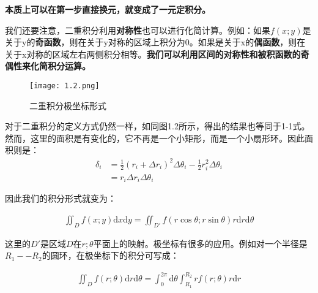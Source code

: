 \documentclass{ctexart}
\let\oldtextbf\textbf
\renewcommand{\textbf}[1]{\textcolor{brown!50!red}{\oldtextbf{#1}}}
\begin{document}
\textbf{\color{brown!50!red}本质上可以在第一步直接换元，就变成了一元定积分。}

我们还要注意，二重积分利用\textbf{\color{brown!50!red}对称性}也可以进行化简计算。例如：如果$f(x;y)$是关于y的\textbf{\color{brown!50!red}奇函数}，则在关于y对称的区域上积分为0。如果是关于x的\textbf{\color{brown!50!red}偶函数}，则在关于x对称的区域左右两侧积分相等。\textbf{\color{brown!50!red}我们可以利用区间的对称性和被积函数的奇偶性来化简积分运算。}

\begin{figure}[H]    
\centering     
\renewcommand{\figurename}{图}     
\renewcommand{\thefigure}{1.2}    
\begin{myimagebox}[width=0.34\textwidth] %
\texttt{[image: 1.2.png]} %
\end{myimagebox}     
\caption{\label{fig:1.2}二重积分极坐标形式}   
\end{figure}

对于二重积分的定义方式仍然一样，如同图1.2所示，得出的结果也等同于1-1式。然而，这里的面积是有变化的，它不再是一个小矩形，而是一个小扇形环。因此面积则是：
\begin{align*}
    \delta_i&=\frac{1}{2}(r_i+\Delta r_i)^2\Delta\theta_i-\frac{1}{2}r_i^2\Delta\theta_i\\
    &=r_i\Delta r_i\Delta \theta_i\tag{1-5}
\end{align*}

因此我们的积分形式就变为：
\begin{tcolorbox}[
    colback=bac2,     %
    colframe=fra2,   %
    coltitle=white,             %
    coltext=tex1,
    title=二重积分极坐标计算方式,
    fonttitle=\bfseries,        %
    arc=3mm,                    %
    breakable,
]
\begin{align*}
    \iint_D f(x;y)\mathrm{d}x\mathrm{d}y=\iint_{D'}f(r\cos\theta;r\sin\theta)r\mathrm{d}r\mathrm{d}\theta\tag{1-6}
\end{align*}
\end{tcolorbox}

这里的$D'$是区域$D$在$r;\theta$平面上的映射。极坐标有很多的应用。例如对一个半径是$R_1--R_2$的圆环，在极坐标下的积分可写成：

\begin{align*}
    \iint_D f(r;\theta)\mathrm{d}r\mathrm{d}\theta=\int_0^{2\pi}\mathrm{d}\theta\int_{R_1}^{R_2}rf(r;\theta)r\mathrm{d}r
\end{align*}
\end{document}
